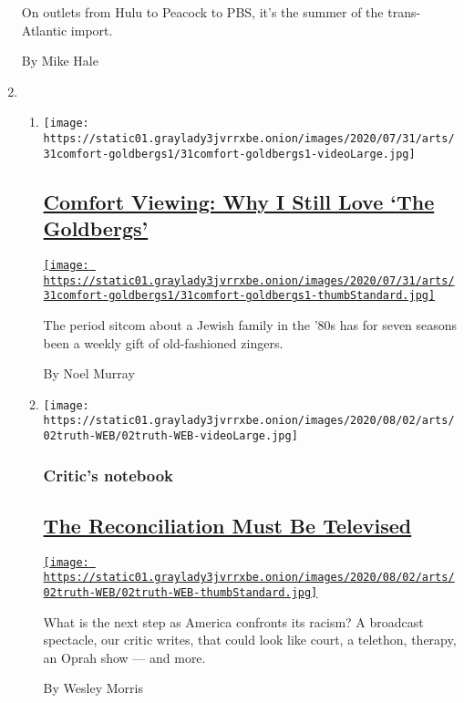 \begin{enumerate}
  On outlets from Hulu to Peacock to PBS, it's the summer of the
  trans-Atlantic import.

  By Mike Hale
\item
  \begin{enumerate}
  \def\labelenumii{\arabic{enumii}.}
  \item
    \texttt{[image: https://static01.graylady3jvrrxbe.onion/images/2020/07/31/arts/31comfort-goldbergs1/31comfort-goldbergs1-videoLarge.jpg]}

    \hypertarget{comfort-viewing-why-i-still-love-the-goldbergs}{%
    \subsection{\texorpdfstring{\href{/2020/07/31/arts/television/goldbergs-abc-stream.html}{Comfort
    Viewing: Why I Still Love `The
    Goldbergs'}}{Comfort Viewing: Why I Still Love `The Goldbergs'}}\label{comfort-viewing-why-i-still-love-the-goldbergs}}

    \href{/2020/07/31/arts/television/goldbergs-abc-stream.html}{\texttt{[image: https://static01.graylady3jvrrxbe.onion/images/2020/07/31/arts/31comfort-goldbergs1/31comfort-goldbergs1-thumbStandard.jpg]}}

    The period sitcom about a Jewish family in the '80s has for seven
    seasons been a weekly gift of old-fashioned zingers.

    By Noel Murray
  \item
    \texttt{[image: https://static01.graylady3jvrrxbe.onion/images/2020/08/02/arts/02truth-WEB/02truth-WEB-videoLarge.jpg]}

    \hypertarget{critics-notebook-2}{%
    \subsubsection{Critic's notebook}\label{critics-notebook-2}}

    \hypertarget{the-reconciliation-must-be-televised}{%
    \subsection{\texorpdfstring{\href{/2020/07/30/arts/television/the-moment-racism-tv.html}{The
    Reconciliation Must Be
    Televised}}{The Reconciliation Must Be Televised}}\label{the-reconciliation-must-be-televised}}

    \href{/2020/07/30/arts/television/the-moment-racism-tv.html}{\texttt{[image: https://static01.graylady3jvrrxbe.onion/images/2020/08/02/arts/02truth-WEB/02truth-WEB-thumbStandard.jpg]}}

    What is the next step as America confronts its racism? A broadcast
    spectacle, our critic writes, that could look like court, a
    telethon, therapy, an Oprah show --- and more.

    By Wesley Morris
  \end{enumerate}
\end{enumerate}

